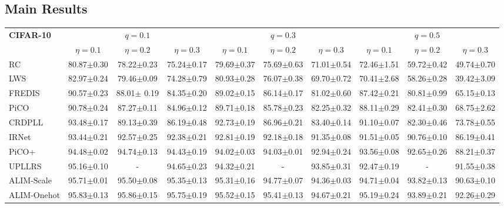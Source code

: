\subsection{Main Results}

\begin{table}[t]
\centering
\fontsize{8pt}{8pt}\selectfont
\setlength{\tabcolsep}{2pt}
\begin{tabular}{l|ccc|ccc|ccc}
\toprule
\multirow{2}{*}{\textbf{CIFAR-10}} &\multicolumn{3}{c|}{ $q=0.1$} &\multicolumn{3}{c|}{$q=0.3$} &\multicolumn{3}{c}{$q=0.5$}\\
\cline{2-10}
&$\eta=0.1$ &$\eta=0.2$ &$\eta=0.3$ &$\eta=0.1$ &$\eta=0.2$ &$\eta=0.3$ &$\eta=0.1$ &$\eta=0.2$ &$\eta=0.3$ \\
\hline
RC& 80.87$\pm$0.30& 78.22$\pm$0.23& 75.24$\pm$0.17& 79.69$\pm$0.37& 75.69$\pm$0.63& 71.01$\pm$0.54& 72.46$\pm$1.51& 59.72$\pm$0.42&49.74$\pm$0.70\\
LWS& 82.97$\pm$0.24& 79.46$\pm$0.09& 74.28$\pm$0.79& 80.93$\pm$0.28& 76.07$\pm$0.38& 69.70$\pm$0.72& 70.41$\pm$2.68& 58.26$\pm$0.28&39.42$\pm$3.09\\ 
FREDIS& 90.57$\pm$0.23& 88.01$\pm$ 0.19 & 84.35$\pm$0.20& 89.02$\pm$0.15& 86.14$\pm$0.17 & 81.02$\pm$0.60& 87.42$\pm$0.21& 80.81$\pm$0.99 &65.15$\pm$0.13\\
PiCO& 90.78$\pm$0.24& 87.27$\pm$0.11& 84.96$\pm$0.12& 89.71$\pm$0.18& 85.78$\pm$0.23& 82.25$\pm$0.32& 88.11$\pm$0.29& 82.41$\pm$0.30&68.75$\pm$2.62 \\
CRDPLL& 93.48$\pm$0.17& 89.13$\pm$0.39& 86.19$\pm$0.48& 92.73$\pm$0.19& 86.96$\pm$0.21& 83.40$\pm$0.14& 91.10$\pm$0.07& 82.30$\pm$0.46&73.78$\pm$0.55 \\
IRNet& 93.44$\pm$0.21& 92.57$\pm$0.25& 92.38$\pm$0.21& 92.81$\pm$0.19& 92.18$\pm$0.18& 91.35$\pm$0.08& 91.51$\pm$0.05& 90.76$\pm$0.10&86.19$\pm$0.41\\
PiCO+ & 94.48$\pm$0.02 & 94.74$\pm$0.13 & 94.43$\pm$0.19 & 94.02$\pm$0.03 & 94.03$\pm$0.01 & 92.94$\pm$0.24 & 93.56$\pm$0.08 & 92.65$\pm$0.26 & 88.21$\pm$0.37 \\
UPLLRS& 95.16$\pm$0.10& -& 94.65$\pm$0.23& 94.32$\pm$0.21& -& 93.85$\pm$0.31& 92.47$\pm$0.19& -&91.55$\pm$0.38\\
ALIM-Scale & 95.71$\pm$0.01 & 95.50$\pm$0.08 & 95.35$\pm$0.13 & 95.31$\pm$0.16 & 94.77$\pm$0.07 & 94.36$\pm$0.03 & 94.71$\pm$0.04 & 93.82$\pm$0.13 & 90.63$\pm$0.10 \\
ALIM-Onehot & 95.83$\pm$0.13 & 95.86$\pm$0.15 & 95.75$\pm$0.19 & 95.52$\pm$0.15 & 95.41$\pm$0.13 & 94.67$\pm$0.21 & 95.19$\pm$0.24 & 93.89$\pm$0.21 & 92.26$\pm$0.29 \\ 

\end{tabular}
\end{table}
